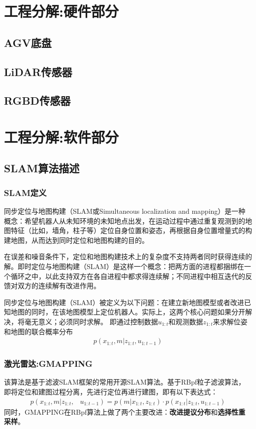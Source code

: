 \documentclass[cs4size,a4paper]{ctexart}
\numberwithin{equation}{section}
\numberwithin{table}{section}
\numberwithin{figure}{section}
\begin{document}
\section{工程分解:硬件部分}

\subsection{AGV底盘}

\subsection{LiDAR传感器}

\subsection{RGBD传感器}

\section{工程分解:软件部分}
\subsection{SLAM算法描述}
\subsubsection{SLAM定义}
同步定位与地图构建（SLAM或Simultaneous localization and mapping）是一种概念：希望机器人从未知环境的未知地点出发，在运动过程中通过重复观测到的地图特征（比如，墙角，柱子等）定位自身位置和姿态，再根据自身位置增量式的构建地图，从而达到同时定位和地图构建的目的。

在误差和噪音条件下，定位和地图构建技术上的复杂度不支持两者同时获得连续的解。即时定位与地图构建（SLAM）是这样一个概念：把两方面的进程都捆绑在一个循环之中，以此支持双方在各自进程中都求得连续解；不同进程中相互迭代的反馈对双方的连续解有改进作用。

同步定位与地图构建（SLAM）被定义为以下问题：在建立新地图模型或者改进已知地图的同时，在该地图模型上定位机器人。实际上，这两个核心问题如果分开解决，将毫无意义；必须同时求解。
即通过控制数据$u_{1:t}$和观测数据$z_{1:t}$来求解位姿和地图的联合概率分布
\begin{align}
    p\left(x_{1: t}, m | z_{1: t}, u_{1: t-1}\right)
\end{align}
\subsubsection{激光雷达:GMAPPING}
该算法\cite{1570477}是基于滤波SLAM框架的常用开源SLAM算法。基于RBpf粒子滤波算法，即将定位和建图过程分离，先进行定位再进行建图，即有以下表达式：
\begin{align}
    p\left(x_{1: t}, m | z_{1: t},\right.&\left.u_{1: t-1}\right) =p\left(m | x_{1: t}, z_{1: t}\right) \cdot p\left(x_{1: t} | z_{1: t}, u_{1: t-1}\right)
\end{align}
同时，GMAPPING在RBpf算法上做了两个主要改进：\textbf{改进提议分布}和\textbf{选择性重采样}。
\end{document}
